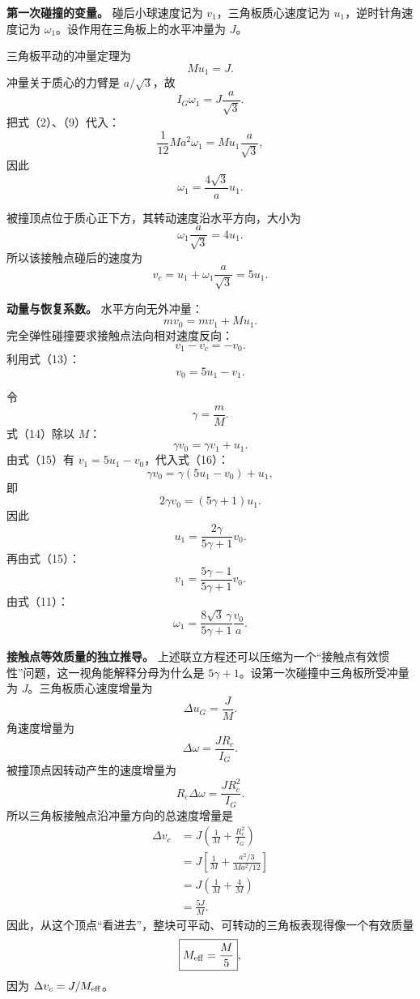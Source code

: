 \documentclass[12pt,a4paper,UTF8]{ctexart}
\begin{document}
\textbf{第一次碰撞的变量。} 碰后小球速度记为 \(v_1\)，三角板质心速度记为
\(u_1\)，逆时针角速度记为 \(\omega_1\)。设作用在三角板上的水平冲量为
\(J\)。

三角板平动的冲量定理为 \[
Mu_1=J. \tag{9}
\] 冲量关于质心的力臂是 \(a/\sqrt3\)，故 \[
I_G\omega_1=J\frac a{\sqrt3}. \tag{10}
\] 把式（2）、（9）代入： \[
\frac1{12}Ma^2\omega_1
=Mu_1\frac a{\sqrt3},
\] 因此 \[
\boxed{\omega_1=\frac{4\sqrt3}{a}u_1}. \tag{11}
\]

被撞顶点位于质心正下方，其转动速度沿水平方向，大小为 \[
\omega_1\frac a{\sqrt3}=4u_1. \tag{12}
\] 所以该接触点碰后的速度为 \[
v_c=u_1+\omega_1\frac a{\sqrt3}=5u_1. \tag{13}
\]

\textbf{动量与恢复系数。} 水平方向无外冲量： \[
mv_0=mv_1+Mu_1. \tag{14}
\] 完全弹性碰撞要求接触点法向相对速度反向： \[
v_1-v_c=-v_0.
\] 利用式（13）： \[
v_0=5u_1-v_1. \tag{15}
\]

令 \[
\gamma=\frac mM.
\] 式（14）除以 \(M\)： \[
\gamma v_0=\gamma v_1+u_1. \tag{16}
\] 由式（15）有 \(v_1=5u_1-v_0\)，代入式（16）： \[
\gamma v_0
=\gamma(5u_1-v_0)+u_1,
\] 即 \[
2\gamma v_0=(5\gamma+1)u_1.
\] 因此 \[
\boxed{
u_1=\frac{2\gamma}{5\gamma+1}v_0
}. \tag{17}
\] 再由式（15）： \[
\boxed{
v_1=\frac{5\gamma-1}{5\gamma+1}v_0
}. \tag{18}
\] 由式（11）： \[
\boxed{
\omega_1
=\frac{8\sqrt3\,\gamma}{5\gamma+1}\frac{v_0}{a}
}. \tag{19}
\]

\textbf{接触点等效质量的独立推导。}
上述联立方程还可以压缩为一个``接触点有效惯性''问题，这一视角能解释分母为什么是
\(5\gamma+1\)。设第一次碰撞中三角板所受冲量为
\(J\)。三角板质心速度增量为 \[
\Delta u_G=\frac JM.
\] 角速度增量为 \[
\Delta\omega=\frac{JR_c}{I_G}.
\] 被撞顶点因转动产生的速度增量为 \[
R_c\Delta\omega
=\frac{JR_c^2}{I_G}.
\] 所以三角板接触点沿冲量方向的总速度增量是 \[
\begin{aligned}
\Delta v_c
&=J\left(
\frac1M+\frac{R_c^2}{I_G}
\right)\\
&=J\left[
\frac1M
+\frac{a^2/3}{Ma^2/12}
\right]\\
&=J\left(
\frac1M+\frac4M
\right)\\
&=\frac{5J}{M}.
\end{aligned}
\]
因此，从这个顶点``看进去''，整块可平动、可转动的三角板表现得像一个有效质量
\[
\boxed{
M_{\rm eff}=\frac M5
},
\] 因为 \(\Delta v_c=J/M_{\rm eff}\)。
\end{document}
